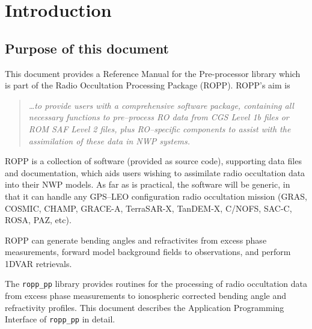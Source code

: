 
\chapter{Introduction}\label{chap:introduction}

\section{Purpose of this document}

This document provides a Reference Manual for the Pre-processor
library which is part of the Radio Occultation Processing Package
(ROPP). ROPP's aim is
%
\begin{quote}
  \emph{\ldots{}to provide users with a comprehensive software
    package, containing all necessary functions to pre--process RO
    data from CGS Level 1b files or ROM SAF Level 2 files, plus
    RO--specific components to assist with the assimilation of these
    data in NWP systems.}
\end{quote}
%
ROPP is a collection of software (provided as source code), supporting
data files and documentation, which aids users wishing to assimilate
radio occultation data into their NWP models. As far as is practical,
the software will be generic, in that it can handle any GPS--LEO
configuration radio occultation mission (GRAS, COSMIC, CHAMP, GRACE-A, 
TerraSAR-X, TanDEM-X, C/NOFS, SAC-C, ROSA, PAZ, etc). 

ROPP can generate bending angles and refractivites from excess phase 
measurements, forward model background fields to observations, 
and perform 1DVAR retrievals. 

The \texttt{ropp\_pp} library provides routines for the processing of 
radio occultation data from excess phase measurements to ionospheric 
corrected bending angle and refractivity profiles. This document describes 
the Application Programming Interface of \texttt{ropp\_pp} in detail.

